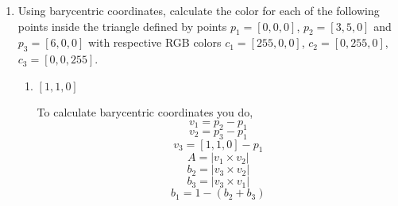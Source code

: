 \documentclass{article}
\begin{document}
\begin{enumerate}
\begin{enumerate}
\begin{mdframed}
                        Next the colors:

                        \begin{displaymath}
                            c = t([-255, 0, 255]) + [255, 0, 0]
                        \end{displaymath}
                        \begin{displaymath}
                            c \approx [36,0,219]
                        \end{displaymath}
                        
                    \end{mdframed}
            \end{enumerate}
        \item Using barycentric coordinates, calculate the color for each of the following points
            inside the triangle defined by points $p_1 = [0,0,0]$, $p_2 = [3,5,0]$ and $p_3 = [6,0,0]$ with
            respective RGB colors $c_1 = [255, 0, 0]$, $c_2 = [0, 255, 0]$, $c_3 = [0, 0, 255]$.

            \begin{enumerate}
                \item $[1,1,0]$
                    \begin{mdframed}
                        To calculate barycentric coordinates you do,
                        \begin{displaymath}
                            v_1 = p_2 - p_1
                        \end{displaymath}
                        \begin{displaymath}
                            v_2 = p_3 - p_1
                        \end{displaymath}
                        \begin{displaymath}
                            v_3 = [1,1,0] - p_1
                        \end{displaymath}
                        \begin{displaymath}
                            A = |v_1 \times v_2|
                        \end{displaymath}
                        \begin{displaymath}
                            b_2 = |v_3 \times v_2|
                        \end{displaymath}
                        \begin{displaymath}
                            b_3 = |v_3 \times v_1|
                        \end{displaymath}
                        \begin{displaymath}
                            b_1 = 1 - (b_2 + b_3)
                        \end{displaymath}


\end{mdframed}
\end{enumerate}
\end{enumerate}
\end{document}
